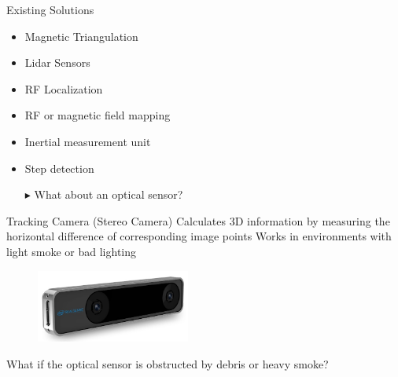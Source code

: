 \documentclass[aspectratio=169]{beamer}
\begin{document}
{	\begin{frame}{Existing Solutions}
		\begin{itemize}
			\item Magnetic Triangulation %
			\item Lidar Sensors %
			\item RF Localization 
			\item RF or magnetic field mapping%
			\item Inertial measurement unit %
			\item Step detection %
			\item[$\blacktriangleright$] What about an optical sensor?
		\end{itemize}
	\end{frame}
	
	
	\begin{frame}{Tracking Camera (Stereo Camera)}
		 Calculates 3D information by measuring the horizontal difference of corresponding image points
		 Works in environments with light smoke or bad lighting
	
		
		
		\begin{figure}
			\centering
			\includegraphics[width=0.45\textwidth]{realsense.jpg}
		\end{figure}
		
			\begin{block}{What if the optical sensor is obstructed by debris or heavy smoke?}
		\end{block}
	\end{frame}
	

}
\end{document}
